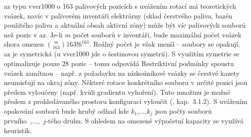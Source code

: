 \ac{az} typu \ac{vver1000} o 163 palivových pozicích s uvážením rotací má 
teoretických 
	vsázek, navíc v palivovém inventáři elektrárny (sklad čerstvého paliva, bazén použitého paliva a aktuální obsah aktivní zóny) 
	může být víc palivových souborů než pozic v \ac{az}. Je-li $m$ počet souborů v inventáři, bude maximální počet vsázek 
	shora omezen $\binom{m}{163} 163! 6^{163}$. 
	Reálný počet je však menší -- soubory se opakují, \ac{az} je symetrická (u \ac{vver1000} jde o šestinovou symetrii). S využitím symetrie se optimalizuje pouze $28$ pozic -- tomu odpovídá 
	Restriktivní podmínky spoustu vsázek zamítnou -- např. z požadavku na nízkoúnikové vsázky 
	se čerstvé kazety neumisťují na okraj zóny. Některé rotace konkrétního souboru v určité pozici jsou předem vyloučeny (např. kvůli gradientu 
	vyhoření). Tuto množinu je možné předem z prohledávaného prostoru konfigurací vyloučit (\cite{roubalik}, kap.~3.1.2). 
	S uvážením opakování souborů bude hrubý odhad 
	kde $k_1$,...,$k_j$ jsou počty souborů prvního~,...,~$j$-tého druhu. 
	S ohledem na omezené výpočetní kapacity se využívá heuristik. 
% 
% 	
% 



